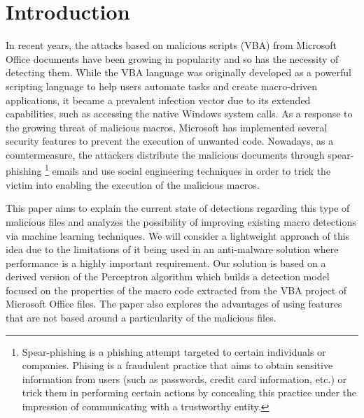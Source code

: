 \section{Introduction}
In recent years, the attacks based on malicious scripts (VBA) from Microsoft Office documents have been growing in popularity and so has the necessity of detecting them. While the VBA language was originally developed as a powerful scripting language to help users automate tasks and create macro-driven applications, it became a prevalent infection vector due to its extended capabilities, such as accessing the native Windows system calls. As a response to the growing threat of malicious macros, Microsoft has implemented several security features to prevent the execution of unwanted code. Nowadays, as a countermeasure, the attackers distribute the malicious documents through spear-phishing \footnote{Spear-phishing is a phishing attempt targeted to certain individuals or companies. Phising is a fraudulent practice that aims to obtain sensitive information from users (such as passwords, credit card information, etc.) or trick them in performing certain actions  by concealing this practice under the impression of communicating with a trustworthy entity.} emails and use social engineering techniques in order to trick the victim into enabling the execution of the malicious macros.
\par
This paper aims to explain the current state of detections regarding this type of malicious files and analyzes the possibility of improving existing macro detections via machine learning techniques. We will consider a lightweight approach of this idea due to the limitations of it being used in an anti-malware solution where performance is a highly important requirement. Our solution is based on a derived version of the Perceptron algorithm which builds a detection model focused on the properties of the macro code extracted from the VBA project of Microsoft Office files. The paper also explores the advantages of using features that are not based around a particularity of the malicious files.
